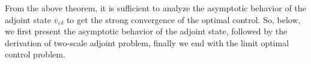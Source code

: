 \documentclass[11pt,a4paper]{article}
\numberwithin{equation}{section}
\def\wo{\overline}
\def\O{\Omega}
\def\e{\varepsilon}
\def\ed{{\varepsilon\delta}}
\def\GJ{{\bf J}}
\begin{document}
%		
%		
	From the above theorem, it is sufficient to analyze the asymptotic behavior of the adjoint state $\wo v_\ed$ to get the strong convergence of the optimal control. So, below, we first present the asymptotic behavior of the adjoint state,  followed by the derivation of two-scale adjoint problem, finally we end with the limit optimal control problem. 
	
\end{document}
